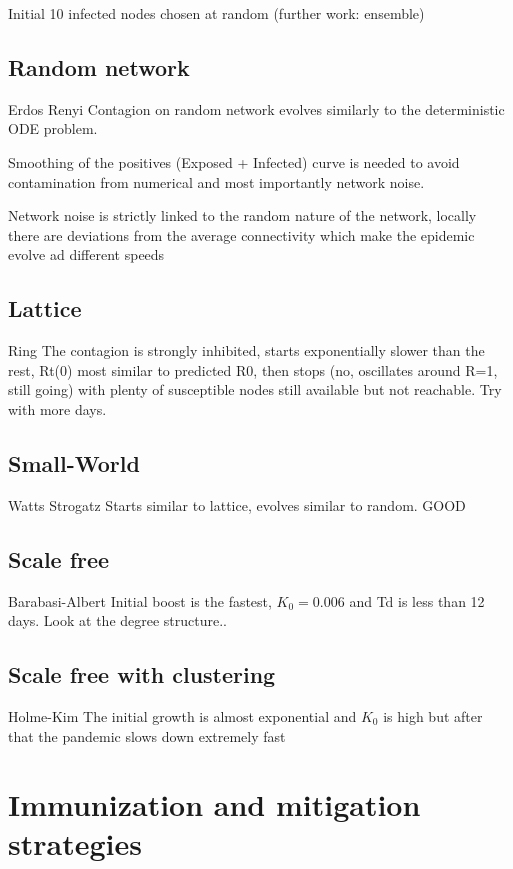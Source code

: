 \documentclass[DIV=12, BCOR=0pt]{scrartcl}  %
\begin{document}
  
  Initial 10 infected nodes chosen at random (further work: ensemble)
  
  \subsection{Random network}
  Erdos Renyi
  Contagion on random network evolves similarly to the deterministic ODE problem. 
  
  Smoothing of the positives (Exposed + Infected) curve is needed to avoid contamination from numerical and most importantly network noise. 
  
  Network noise is strictly linked to the random nature of the network, locally there are deviations from the average connectivity which make the epidemic evolve ad different speeds
  
  
  \subsection{Lattice}
  Ring
  The contagion is strongly inhibited, starts exponentially slower than the rest, Rt(0) most similar to predicted R0,
  then stops (no, oscillates around R=1, still going) with plenty of susceptible nodes still available but not reachable. Try with more days.
  
  
  \subsection{Small-World}
  Watts Strogatz
  Starts similar to lattice, evolves similar to random. GOOD
  
  \subsection{Scale free}
  Barabasi-Albert
  Initial boost is the fastest, $K_0=0.006$ and Td is less than 12 days. Look at the degree structure..
  
  
  \subsection{Scale free with clustering}
  Holme-Kim
  The initial growth is almost exponential and $K_0$ is high but after that the pandemic slows down extremely fast
  
  
  
  
  
  
  \section{Immunization and mitigation strategies}
\end{document}
